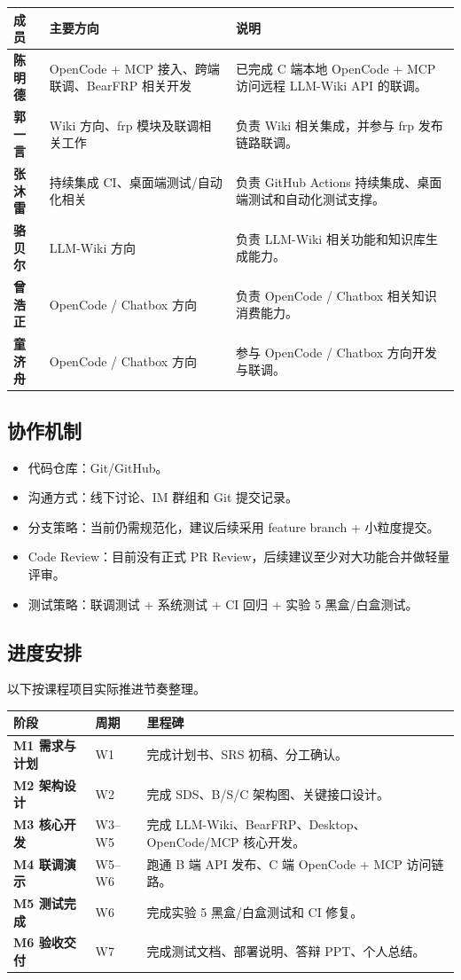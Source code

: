 \documentclass[UTF8,a4paper,12pt,fontset=fandol]{ctexart}
\begin{document}
\begin{longtable}{>{\bfseries}p{2.6cm}p{5.2cm}p{6.4cm}}
\toprule
成员 & 主要方向 & 说明 \\
\midrule
陈明德 & OpenCode + MCP 接入、跨端联调、BearFRP 相关开发 & 已完成 C 端本地 OpenCode + MCP 访问远程 LLM-Wiki API 的联调。 \\
郭一言 & Wiki 方向、frp 模块及联调相关工作 & 负责 Wiki 相关集成，并参与 frp 发布链路联调。 \\
张沐雷 & 持续集成 CI、桌面端测试/自动化相关 & 负责 GitHub Actions 持续集成、桌面端测试和自动化测试支撑。 \\
骆贝尔 & LLM-Wiki 方向 & 负责 LLM-Wiki 相关功能和知识库生成能力。 \\
曾浩正 & OpenCode / Chatbox 方向 & 负责 OpenCode / Chatbox 相关知识消费能力。 \\
童济舟 & OpenCode / Chatbox 方向 & 参与 OpenCode / Chatbox 方向开发与联调。 \\
\bottomrule
\end{longtable}

\subsection{协作机制}
\begin{itemize}
  \item 代码仓库：Git/GitHub。
  \item 沟通方式：线下讨论、IM 群组和 Git 提交记录。
  \item 分支策略：当前仍需规范化，建议后续采用 feature branch + 小粒度提交。
  \item Code Review：目前没有正式 PR Review，后续建议至少对大功能合并做轻量评审。
  \item 测试策略：联调测试 + 系统测试 + CI 回归 + 实验 5 黑盒/白盒测试。
\end{itemize}

\subsection{进度安排}
以下按课程项目实际推进节奏整理。

\begin{longtable}{>{\bfseries}p{3.2cm}p{2.5cm}p{8.3cm}}
\toprule
阶段 & 周期 & 里程碑 \\
\midrule
M1 需求与计划 & W1 & 完成计划书、SRS 初稿、分工确认。 \\
M2 架构设计 & W2 & 完成 SDS、B/S/C 架构图、关键接口设计。 \\
M3 核心开发 & W3--W5 & 完成 LLM-Wiki、BearFRP、Desktop、OpenCode/MCP 核心开发。 \\
M4 联调演示 & W5--W6 & 跑通 B 端 API 发布、C 端 OpenCode + MCP 访问链路。 \\
M5 测试完成 & W6 & 完成实验 5 黑盒/白盒测试和 CI 修复。 \\
M6 验收交付 & W7 & 完成测试文档、部署说明、答辩 PPT、个人总结。 \\
\bottomrule
\end{longtable}
\end{document}
